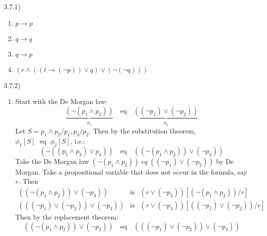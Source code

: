 3.7.1)
\begin{multicols}{2}
\begin{enumerate}
  \item \(p \to p\)
  \item \(q \to q\)
  \item \(q \to p\)
  \item \((r \land ((t \to (\neg p)) \lor q) \lor (\neg(\neg q)))\)
\end{enumerate}
\end{multicols}

3.7.2)
\begin{enumerate}
  \item Start with the De Morgan law:
\[
  \underbrace{(\neg(p_1 \land p_2))}_{\phi_1}  \quad \text{eq} \quad \underbrace{((\neg p_1) \lor (\neg p_2))}_{\phi_2}
\]
Let \(S = p_1 \land p_2/p_1, p_3/p_2\). Then by the substitution theorem, \(\phi_1[S] \; \text{~eq~} \; \phi_2[S]\), i.e.:
\[
  (\neg((p_1 \land p_2) \lor p_3)) \quad \text{eq} \quad ((\neg (p_1 \land p_2)) \lor (\neg p_3))
\]
Take the De Morgan law \((\neg (p_1 \land p_2)) \; eq \; ((\neg p_1) \lor (\neg p_2))\) by De Morgan. Take a propositional variable that does not occur in the formula, say \(r\). Then
\[
\begin{array}{lcr}
  ((\neg (p_1 \land p_2)) \lor (\neg p_3)) & \text{is} & (r \lor (\neg p_3))[(\neg(p_1 \land p_2))/r] \\
  (((\neg p_1) \lor (\neg p_2)) \lor (\neg p_3)) & \text{is} & (r \lor (\neg p_3))[((\neg p_1) \lor (\neg p_2))/r]
\end{array}
\]
Then by the replacement theorem:
\[
  ((\neg (p_1 \land p_2)) \lor (\neg p_3)) \quad \text{eq} \quad (((\neg p_1) \lor (\neg p_2)) \lor (\neg p_3))
\]


\end{enumerate}

